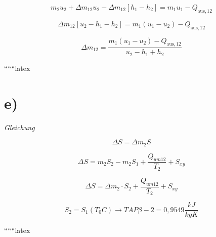 \[
m_2 u_2 + \Delta m_{12} u_2 - \Delta m_{12} \left[ h_1 - h_2 \right] = m_1 u_1 - Q_{\text{aus},12}
\]

\[
\Delta m_{12} \left[ u_2 - h_1 - h_2 \right] = m_1 (u_1 - u_2) - Q_{\text{aus},12}
\]

\[
\Delta m_{12} = \frac{m_1 (u_1 - u_2) - Q_{\text{aus},12}}{u_2 - h_1 + h_2}
\]

``````latex


\section*{e)}

\textit{Gleichung}

\[
\Delta S = \Delta m_2 S
\]

\[
\Delta S = m_2 S_2 - m_2 S_1 + \frac{Q_{um12}}{T_2} + S_{xy}
\]

\[
\Delta S = \Delta m_2 \cdot S_2 + \frac{Q_{um12}}{T_2} + S_{xy}
\]

\[
S_2 = S_1 (T_0 C) \rightarrow TAP \beta - 2 = 0,9549 \frac{kJ}{kgK}
\]

``````latex


